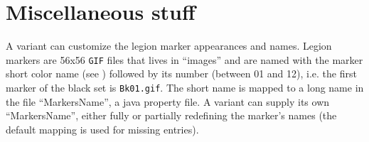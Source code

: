 \documentclass{article}
\begin{document}
\section{Miscellaneous stuff}

A variant can customize the legion marker appearances and names. Legion markers are 56x56 \texttt{GIF} files that lives in ``images'' and are named with the marker short color name (see ) followed by its number (between 01 and 12), i.e. the first marker of the black set is \texttt{Bk01.gif}. The short name is mapped to a long name in the file ``MarkersName'', a java property file. A variant can supply its own ``MarkersName'', either fully or partially redefining the marker's names (the default mapping is used for missing entries).
\end{document}
